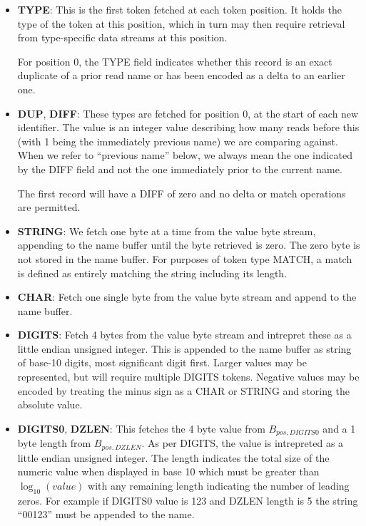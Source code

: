 \documentclass[a4paper]{article}
\begin{document}
\begin{itemize}
\item{\textbf{TYPE}:}
This is the first token fetched at each token position.  It holds the
type of the token at this position, which in turn may then require
retrieval from type-specific data streams at this position.

For position 0, the TYPE field indicates whether this record is an
exact duplicate of a prior read name or has been encoded as a delta to
an earlier one.

\item{\textbf{DUP}, \textbf{DIFF}:}
These types are fetched for position 0, at the start of each new
identifier.  The value is an integer value describing how many reads
before this (with 1 being the immediately previous name) we are
comparing against.  When we refer to ``previous name'' below, we
always mean the one indicated by the DIFF field and not the one
immediately prior to the current name.

The first record will have a DIFF of zero and no delta or match
operations are permitted.

\item{\textbf{STRING}:}
We fetch one byte at a time from the value byte stream, appending to the
name buffer until the byte retrieved is zero.  The zero byte is not
stored in the name buffer.
For purposes of token type MATCH, a match is defined as entirely
matching the string including its length.

\item{\textbf{CHAR}:}
Fetch one single byte from the value byte stream and append to the name buffer.

\item{\textbf{DIGITS}:}
Fetch 4 bytes from the value byte stream and intrepret these as a little
endian unsigned integer.  This is appended to the name buffer as
string of base-10 digits, most significant digit first.  Larger
values may be represented, but will require multiple DIGITS tokens.
Negative values may be encoded by treating the minus sign as a CHAR or
STRING and storing the absolute value.

\item{\textbf{DIGITS0}, \textbf{DZLEN}:}
This fetches the 4 byte value from $B_{pos,DIGITS0}$ and a 1 byte
length from $B_{pos,DZLEN}$.  As per DIGITS, the value is intrepreted as a
little endian unsigned integer.  The length indicates the total
size of the numeric value when displayed in base 10 which must be
greater than $\log_{10}(value)$ with any remaining length indicating
the number of leading zeros.  For example if DIGITS0 value is 123 and
DZLEN length is 5 the string ``00123'' must be appended to the name.


\end{itemize}
\end{document}
